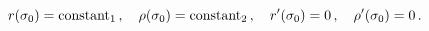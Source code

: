 \begin{equation}
\label{condi}
r(\sigma_0) = {\rm constant}_1\,,\quad \rho(\sigma_0) = {\rm constant}_2\,,\quad
r^\prime(\sigma_0) = 0\,,\quad \rho^\prime(\sigma_0) = 0\,.
\end{equation}

